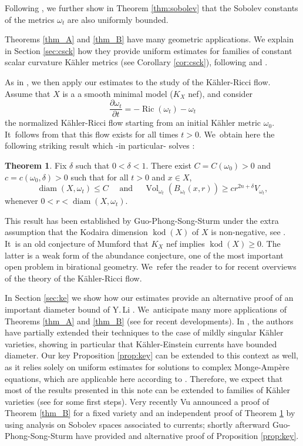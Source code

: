 \documentclass[10pt]{amsart}
\DeclareMathOperator{\diam}{diam}
\DeclareMathOperator{\kod}{kod}
\DeclareMathOperator{\Ric}{Ric}
\DeclareMathOperator{\Vol}{Vol}
\theoremstyle{definition}
\newtheorem{thmA}{Theorem}
\begin{document}
Following \cite{GPSS23}, we further show in Theorem \ref{thm:sobolev}
that the Sobolev constants of the metrics $\omega_t$ are also uniformly bounded.

Theorems \ref{thm_A} and \ref{thm_B} have many geometric applications. We
explain in Section \ref{sec:csck} how they provide uniform estimates
for families of constant scalar curvature Kähler metrics (see Corollary \ref{cor:csck}), following
\cite{CC21} and \cite{PTT23}.

As in \cite{GPSS22}, we then apply our estimates to the study of the Kähler-Ricci flow.
Assume that $X$ is a a smooth minimal model ($K_X$ nef), and consider\vspace*{-3pt}
\[
\frac{\partial \omega_t}{\partial t}=-\Ric(\omega_t)-\omega_t
\]
the normalized Kähler-Ricci flow starting from an initial Kähler metric $\omega_0$. It~follows from \cite{TZ06} that this flow exists for all times $t>0$. We~obtain here the following striking result which -in particular- solves \cite[Conj.\,6.2]{Tos18}:

\begin{thmA}\label{thm_C}
Fix $\delta$ such that $0<\delta<1$.
There exist $C=C(\omega_0)>0$ and $c=c(\omega_0,\delta)>0$ such that for all $t>0$ and $x \in X$,\vspace*{-3pt}
\[
\diam(X,\omega_t) \leq C
\quad \text{ and } \quad
\Vol_{\omega_t}(B_{\omega_t}(x,r)) \geq c r^{2n+\delta} V_{\omega_t},
\]
whenever $0<r<\diam(X,\omega_t)$.
\end{thmA}

This result has been established by Guo-Phong-Song-Sturm under the extra assumption that
the Kodaira dimension $\kod(X)$ of $X$ is non-negative, see \cite[Th.\,2.3]{GPSS22}. It~is an old conjecture of Mumford that $K_X$ nef implies $\kod(X) \geq 0$.
The latter is a weak form of the abundance conjecture, one of the most important open problem in
birational geometry. We~refer the reader to \cite{Tos18,Tos24} for recent overviews of the theory of the Kähler-Ricci flow.

In Section \ref{sec:ke} we show how our estimates provide an alternative proof of an important
diameter bound of Y.\,Li \cite[Th.\,1.4]{Li23}. We~anticipate many more applications of Theorems \ref{thm_A} and \ref{thm_B} (see \cite{CGNPPW23,GP24} for recent developments).
In \cite{GPSS23}, the authors have partially extended their techniques
to the case of mildly singular Kähler varieties, showing in particular that Kähler-Einstein currents have
bounded diameter. Our key Proposition \ref{prop:key} can be extended to this context as well, as it relies solely
on uniform estimates for solutions to complex Monge-Ampère equations,
which are applicable here according to \cite[Th.\,1.9]{DnGG23}.
Therefore, we expect that most of the results presented in this note can be extended to families of
Kähler varieties (see \cite[\S 3]{GP24} for some first steps).
Very recently Vu \cite{V24} announced a proof of Theorem \ref{thm_B} for a fixed variety
and an independent proof of Theorem \ref{thm_C} by using analysis on Sobolev spaces associated to currents;
shortly afterward Guo-Phong-Song-Sturm \cite{GPSS24} have provided and alternative proof of Proposition \ref{prop:key}.
\end{document}
